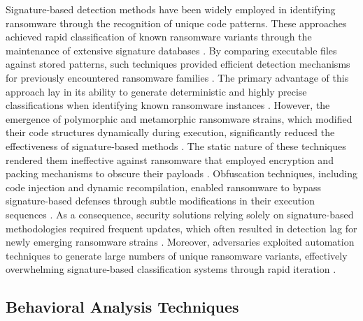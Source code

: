 \documentclass[lettersize,journal]{IEEEtran}
\begin{document}
Signature-based detection methods have been widely employed in identifying ransomware through the recognition of unique code patterns. These approaches achieved rapid classification of known ransomware variants through the maintenance of extensive signature databases \cite{burck2024ransomware}. By comparing executable files against stored patterns, such techniques provided efficient detection mechanisms for previously encountered ransomware families \cite{loco2024adaptive}. The primary advantage of this approach lay in its ability to generate deterministic and highly precise classifications when identifying known ransomware instances \cite{anticore2024neural}. However, the emergence of polymorphic and metamorphic ransomware strains, which modified their code structures dynamically during execution, significantly reduced the effectiveness of signature-based methods \cite{hamill2024detecting}. The static nature of these techniques rendered them ineffective against ransomware that employed encryption and packing mechanisms to obscure their payloads \cite{neweva2024forensic}. Obfuscation techniques, including code injection and dynamic recompilation, enabled ransomware to bypass signature-based defenses through subtle modifications in their execution sequences \cite{shanks2024innovative}. As a consequence, security solutions relying solely on signature-based methodologies required frequent updates, which often resulted in detection lag for newly emerging ransomware strains \cite{totham2024dynamic}. Moreover, adversaries exploited automation techniques to generate large numbers of unique ransomware variants, effectively overwhelming signature-based classification systems through rapid iteration \cite{kayess2024novel}.

\subsection{Behavioral Analysis Techniques}
\end{document}
